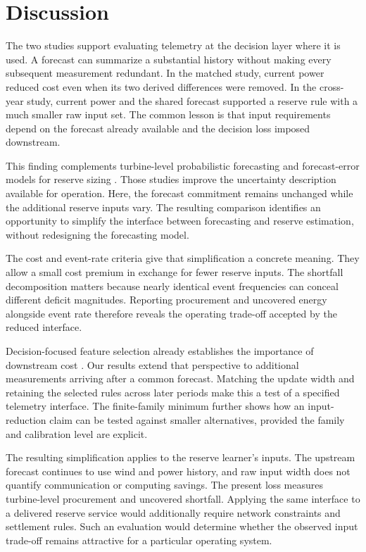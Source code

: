 \section{Discussion}

The two studies support evaluating telemetry at the decision layer where it is used. A forecast can summarize a substantial history without making every subsequent measurement redundant. In the matched study, current power reduced cost even when its two derived differences were removed. In the cross-year study, current power and the shared forecast supported a reserve rule with a much smaller raw input set. The common lesson is that input requirements depend on the forecast already available and the decision loss imposed downstream.

This finding complements turbine-level probabilistic forecasting \cite{gilbert2020} and forecast-error models for reserve sizing \cite{bruninx2014}. Those studies improve the uncertainty description available for operation. Here, the forecast commitment remains unchanged while the additional reserve inputs vary. The resulting comparison identifies an opportunity to simplify the interface between forecasting and reserve estimation, without redesigning the forecasting model.

The cost and event-rate criteria give that simplification a concrete meaning. They allow a small cost premium in exchange for fewer reserve inputs. The shortfall decomposition matters because nearly identical event frequencies can conceal different deficit magnitudes. Reporting procurement and uncovered energy alongside event rate therefore reveals the operating trade-off accepted by the reduced interface.

Decision-focused feature selection already establishes the importance of downstream cost \cite{munoz2020featuredriven,serrano2024featureselection}. Our results extend that perspective to additional measurements arriving after a common forecast. Matching the update width and retaining the selected rules across later periods make this a test of a specified telemetry interface. The finite-family minimum further shows how an input-reduction claim can be tested against smaller alternatives, provided the family and calibration level are explicit.

The resulting simplification applies to the reserve learner's inputs. The upstream forecast continues to use wind and power history, and raw input width does not quantify communication or computing savings. The present loss measures turbine-level procurement and uncovered shortfall. Applying the same interface to a delivered reserve service would additionally require network constraints and settlement rules. Such an evaluation would determine whether the observed input trade-off remains attractive for a particular operating system.

